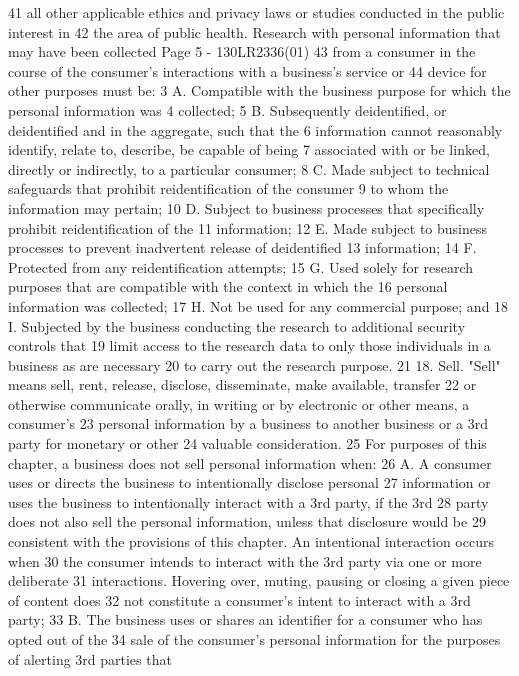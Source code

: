 41 all other applicable ethics and privacy laws or studies conducted in the public interest in
42 the area of public health. Research with personal information that may have been collected 
Page 5 - 130LR2336(01)
43 from a consumer in the course of the consumer's interactions with a business's service or
44 device for other purposes must be:
3 A. Compatible with the business purpose for which the personal information was
4 collected;
5 B. Subsequently deidentified, or deidentified and in the aggregate, such that the
6 information cannot reasonably identify, relate to, describe, be capable of being
7 associated with or be linked, directly or indirectly, to a particular consumer;
8 C. Made subject to technical safeguards that prohibit reidentification of the consumer
9 to whom the information may pertain;
10 D. Subject to business processes that specifically prohibit reidentification of the
11 information;
12 E. Made subject to business processes to prevent inadvertent release of deidentified
13 information;
14 F. Protected from any reidentification attempts;
15 G. Used solely for research purposes that are compatible with the context in which the
16 personal information was collected;
17 H. Not be used for any commercial purpose; and
18 I. Subjected by the business conducting the research to additional security controls that
19 limit access to the research data to only those individuals in a business as are necessary
20 to carry out the research purpose.
21 18. Sell. "Sell" means sell, rent, release, disclose, disseminate, make available, transfer
22 or otherwise communicate orally, in writing or by electronic or other means, a consumer's
23 personal information by a business to another business or a 3rd party for monetary or other
24 valuable consideration.
25 For purposes of this chapter, a business does not sell personal information when:
26 A. A consumer uses or directs the business to intentionally disclose personal
27 information or uses the business to intentionally interact with a 3rd party, if the 3rd
28 party does not also sell the personal information, unless that disclosure would be
29 consistent with the provisions of this chapter. An intentional interaction occurs when
30 the consumer intends to interact with the 3rd party via one or more deliberate
31 interactions. Hovering over, muting, pausing or closing a given piece of content does
32 not constitute a consumer's intent to interact with a 3rd party;
33 B. The business uses or shares an identifier for a consumer who has opted out of the
34 sale of the consumer's personal information for the purposes of alerting 3rd parties that
